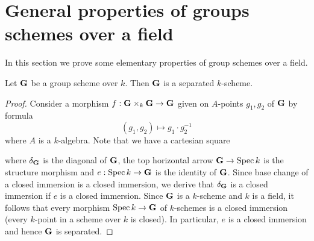 \section{General properties of groups schemes over a field}
\noindent
In this section we prove some elementary properties of group schemes over a field.

\begin{proposition}\label{proposition:group_schemes_over_a_field_are_separated}
Let $\mathbf{G}$ be a group scheme over $k$. Then $\mathbf{G}$ is a separated $k$-scheme.
\end{proposition}
\begin{proof}
Consider a morphism $f:\mathbf{G}\times_k\mathbf{G}\rightarrow \mathbf{G}$ given on $A$-points $g_1,g_2$ of $\mathbf{G}$ by formula
$$(g_1,g_2) \mapsto  g_1\cdot g_2^{-1}$$
where $A$ is a $k$-algebra. Note that we have a cartesian square
\begin{center}
\end{center}
where $\delta_{\mathbf{G}}$ is the diagonal of $\mathbf{G}$, the top horizontal arrow $\mathbf{G}\rightarrow \mathrm{Spec}\, k$ is the structure morphism and $e:\mathrm{Spec}\, k\rightarrow \mathbf{G}$ is the identity of $\mathbf{G}$. Since base change of a closed immersion is a closed immersion, we derive that $\delta_{\mathbf{G}}$ is a closed immersion if $e$ is a closed immersion. Since $\mathbf{G}$ is a $k$-scheme and $k$ is a field, it follows that every morphism $\mathrm{Spec}\, k\rightarrow \mathbf{G}$ of $k$-schemes is a closed immersion (every $k$-point in a scheme over $k$ is closed). In particular, $e$ is a closed immersion and hence $\mathbf{G}$ is separated.
\end{proof}

